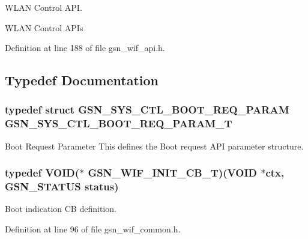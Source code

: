 WLAN Control API. 

WLAN Control APIs 

Definition at line 188 of file gsn\_\-wif\_\-api.h.



\subsection{Typedef Documentation}
\hypertarget{a00636_ga131a12dab3ad56372462964539832fe9}{
\subsubsection[{GSN\_\-SYS\_\-CTL\_\-BOOT\_\-REQ\_\-PARAM\_\-T}]{\setlength{\rightskip}{0pt plus 5cm}typedef struct {\bf GSN\_\-SYS\_\-CTL\_\-BOOT\_\-REQ\_\-PARAM} {\bf GSN\_\-SYS\_\-CTL\_\-BOOT\_\-REQ\_\-PARAM\_\-T}}}
\label{a00636_ga131a12dab3ad56372462964539832fe9}


Boot Request Parameter This defines the Boot request API parameter structure. 

\hypertarget{a00636_gad3465a5565359704a4c7d30e8e3ff127}{
\subsubsection[{GSN\_\-WIF\_\-INIT\_\-CB\_\-T}]{\setlength{\rightskip}{0pt plus 5cm}typedef VOID($\ast$ {\bf GSN\_\-WIF\_\-INIT\_\-CB\_\-T})(VOID $\ast$ctx, {\bf GSN\_\-STATUS} status)}}
\label{a00636_gad3465a5565359704a4c7d30e8e3ff127}


Boot indication CB definition. 



Definition at line 96 of file gsn\_\-wif\_\-common.h.


